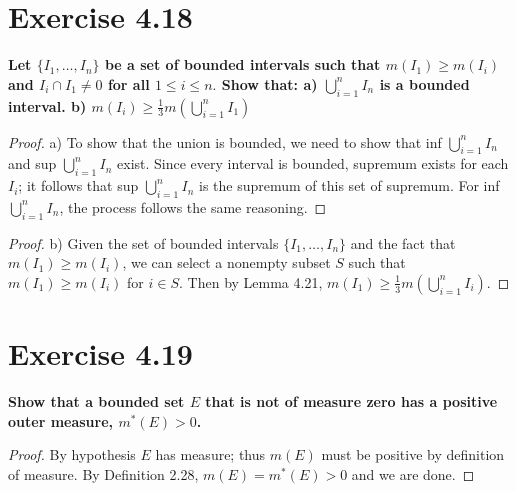 \documentclass[paper=a4, fontsize=11pt]{scrartcl} %
\begin{document}
\section*{Exercise 4.18}
\boldmath
\textbf{Let $\{I_1, \dots, I_n \}$ be a set of bounded intervals such that $m(I_1) \geq m(I_i)$ and $I_i \cap I_1 \neq 0$ for all $1 \leq i \leq n.$  Show that: \newline a)  $\bigcup_{i = 1}^{n} I_n$ is a bounded interval. 
\newline b)  $m(I_i) \geq \frac{1}{3}m\left( \bigcup_{i = 1}^{n} I_1 \right)$}
\unboldmath
\newline
\begin{proof}
a)     To show that the union is bounded, we need to show that inf $\bigcup_{i = 1}^{n} I_n$ and sup $\bigcup_{i = 1}^{n} I_n$ exist.
\newline
Since every interval is bounded, supremum exists for each $I_i$; it follows that sup $\bigcup_{i = 1}^{n} I_n$ is the supremum of this set of supremum.  For inf $\bigcup_{i = 1}^{n} I_n$, the process follows the same reasoning. 
\end{proof}
\begin{proof}
b)
Given the set of bounded intervals $\{I_1, \dots, I_n\}$ and the fact that $m(I_1) \geq m(I_i)$, we can select a nonempty subset $S$ such that $m(I_1) \geq m(I_i)$ for $i \in S$.  Then by Lemma 4.21, 
$m(I_1) \geq \frac{1}{3} m \left( \bigcup_{i = 1}^{n} I_i \right) $.
\end{proof}

\section*{Exercise 4.19}
\boldmath
\textbf{Show that a bounded set $E$ that is not of measure zero has a positive outer measure, $m^*(E) >0$.}
\unboldmath
\begin{proof}
By hypothesis $E$ has measure; thus $m(E)$ must be positive by definition of measure.  By Definition 2.28, $m(E) = m^*(E) > 0$ and we are done.
\end{proof}

\end{document}
